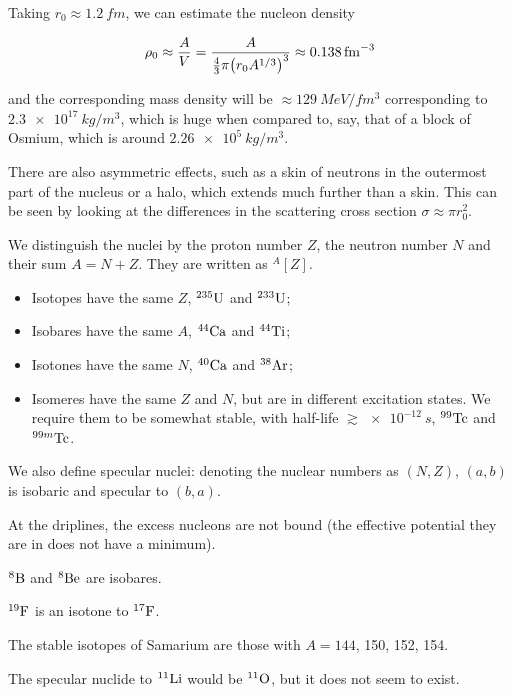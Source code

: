 \documentclass[main.tex]{subfiles}
\begin{document}
\begin{bluebox}
  Taking \(r_0 \approx \SI{1.2}{fm} \), we can estimate the nucleon density

  \begin{equation}
      \rho_0 \approx \frac{A}{V} = \frac{A}{\frac{4}{3} \pi \qty(r_0 A^{1/3})^3} \approx \SI{0.138}{fm^{-3}}
  \end{equation}

  and the corresponding mass density will be \(\approx \SI{129}{MeV \per fm^3}\) corresponding to \( \SI{2.3e17}{kg \per m^3}\), which is huge when compared to, say, that of a block of Osmium, which is around \(\SI{2.26e5}{kg \per m^3}\).
\end{bluebox}

There are also asymmetric effects, such as a skin of neutrons in the outermost part of the nucleus or a halo, which extends much further than a skin. This can be seen by looking at the differences in the scattering cross section \(\sigma \approx \pi r_0^2\).

We distinguish the nuclei by the proton number \(Z\), the neutron number \(N\) and their sum \(A = N+Z\). They are written as \(^{A} [Z]\).

\begin{itemize}
    \item Isotopes have the same \(Z\), \(^{235} \ce{U} \) and \(^{233} \ce{U}  \);
    \item Isobares have the same \(A\), \(^{44} \ce{Ca} \) and \(^{44} \ce{Ti} \);
    \item Isotones have the same \(N\), \(^{40} \ce{Ca} \) and \(^{38} \ce{Ar} \);
    \item Isomeres have the same \(Z\) and \(N\), but are in different excitation states. We require them to be somewhat stable, with half-life \({\gtrsim \SI{e-12}{s}}\), \(^{99}\ce{Tc}  \) and \(^{99m}\ce{Tc}  \).
\end{itemize}

We also define specular nuclei: denoting the nuclear numbers as \((N,Z)\), \((a, b)\) is isobaric and specular to \((b, a)\).

\begin{bluebox}
  At the driplines, the excess nucleons are not bound (the effective potential they are in does not have a minimum).

  \(^{8} \ce{B} \) and \(^{8} \ce{Be} \) are isobares.

  \(^{19} \ce{F} \) is an isotone to \(^{17} \ce{F} \).

  The stable isotopes of Samarium are those with \(A=144\), 150, 152, 154.

  The specular nuclide to \(^{11} \ce{Li} \) would be \(^{11} \ce{O} \), but it does not seem to exist.
\end{bluebox}
\end{document}
